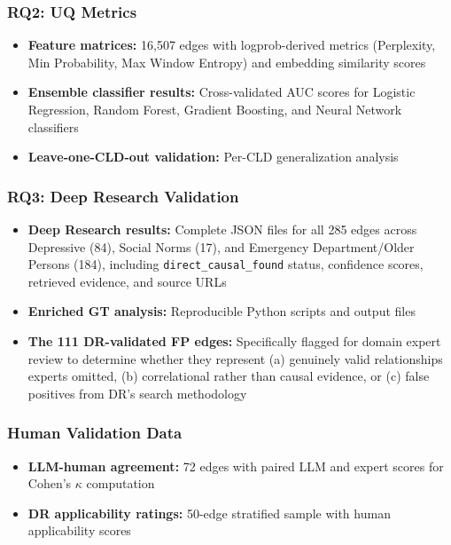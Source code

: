 \subsubsection{RQ2: UQ Metrics}

\begin{itemize}[noitemsep]
    \item \textbf{Feature matrices:} 16,507 edges with logprob-derived metrics (Perplexity, Min Probability, Max Window Entropy) and embedding similarity scores
    \item \textbf{Ensemble classifier results:} Cross-validated AUC scores for Logistic Regression, Random Forest, Gradient Boosting, and Neural Network classifiers
    \item \textbf{Leave-one-CLD-out validation:} Per-CLD generalization analysis
\end{itemize}

\subsubsection{RQ3: Deep Research Validation}

\begin{itemize}[noitemsep]
    \item \textbf{Deep Research results:} Complete JSON files for all 285 edges across Depressive (84), Social Norms (17), and Emergency Department/Older Persons (184), including \texttt{direct\_causal\_found} status, confidence scores, retrieved evidence, and source URLs
    \item \textbf{Enriched GT analysis:} Reproducible Python scripts and output files
    \item \textbf{The 111 DR-validated FP edges:} Specifically flagged for domain expert review to determine whether they represent (a) genuinely valid relationships experts omitted, (b) correlational rather than causal evidence, or (c) false positives from DR's search methodology
\end{itemize}

\subsubsection{Human Validation Data}

\begin{itemize}[noitemsep]
    \item \textbf{LLM-human agreement:} 72 edges with paired LLM and expert scores for Cohen's $\kappa$ computation
    \item \textbf{DR applicability ratings:} 50-edge stratified sample with human applicability scores
\end{itemize}

